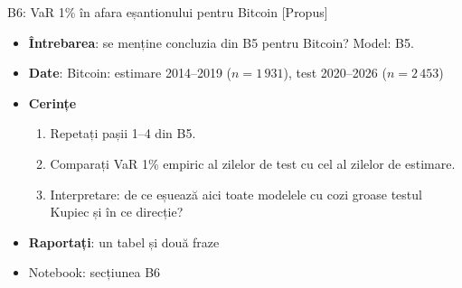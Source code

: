 \begin{frame}{B6: VaR 1\% în afara eșantionului pentru Bitcoin [Propus]}
\itemsize{\footnotesize}
\begin{itemize}
\item \textbf{Întrebarea}: se menține concluzia din B5 pentru Bitcoin? Model: B5.
\item \textbf{Date}: Bitcoin: estimare 2014--2019 ($n = 1\,931$), test 2020--2026 ($n = 2\,453$)
\item \textbf{Cerințe}
\begin{enumerate}
    \item Repetați pașii 1--4 din B5.
    \item Comparați VaR 1\% empiric al zilelor de test cu cel al zilelor de estimare.
    \item Interpretare: de ce eșuează aici toate modelele cu cozi groase testul Kupiec și în ce direcție?
\end{enumerate}
\item \textbf{Raportați}: un tabel și două fraze
\item Notebook: secțiunea B6
\end{itemize}
\end{frame}

